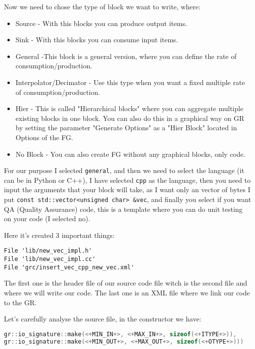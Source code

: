 \documentclass[a4paper, 10pt, conference]{ieeeconf}      %
\begin{document}
    Now we need to chose the type of block we want to write, where:
    \begin{itemize}
        \item Source - With this blocks you can produce output items.
        \item Sink - With this blocks you can consume input items.
        \item General -This block is a general version, where you can define the rate of consumption/production. 
        \item Interpolator/Decimator - Use this type when you want a fixed multiple rate of consumption/production.
        \item Hier - This is called "Hierarchical blocks" where you can aggregate multiple existing blocks in one block. You can also do this in a graphical way on GR by setting the parameter "Generate Options" as a "Hier Block" located in Options of the FG.
        \item No Block - You can also create FG without any graphical blocks, only code.
    \end{itemize}
    
    For our purpose I selected \verb|general|, and then we need to select the language (it can be in Python or C++), I have selected \verb|cpp| as the language, then you need to input the arguments that your block will take, as I want only an vector of bytes I put \verb|const std::vector<unsigned char> &vec|, and  finally you select if you want QA (Quality Assurance) code, this is a template where you can do unit testing on your code (I selected no).
    
    Here it's created 3 important things:
\begin{verbatim}
File 'lib/new_vec_impl.h'
File 'lib/new_vec_impl.cc'
File 'grc/insert_vec_cpp_new_vec.xml'
\end{verbatim}

    The first one is the header file of our source code file witch is the second file and where we will write our code. The last one is an XML file where we link our code to the GR.
    
    Let's carefully analyse the source file, in the constructor we have:
\begin{lstlisting}[language=c++, breaklines]
gr::io_signature::make(<+MIN_IN+>, <+MAX_IN+>, sizeof(<+ITYPE+>)),
gr::io_signature::make(<+MIN_OUT+>, <+MAX_OUT+>, sizeof(<+OTYPE+>)))
\end{lstlisting}
\end{document}
